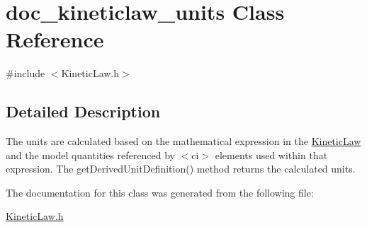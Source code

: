 \hypertarget{classdoc__kineticlaw__units}{}\section{doc\+\_\+kineticlaw\+\_\+units Class Reference}
\label{classdoc__kineticlaw__units}


{\ttfamily \#include $<$Kinetic\+Law.\+h$>$}



\subsection{Detailed Description}
\begin{DoxyParagraph}{}
The units are calculated based on the mathematical expression in the \hyperlink{class_kinetic_law}{Kinetic\+Law} and the model quantities referenced by {\ttfamily $<$ci$>$} elements used within that expression. The get\+Derived\+Unit\+Definition() method returns the calculated units. 
\end{DoxyParagraph}


The documentation for this class was generated from the following file\+:\begin{DoxyCompactItemize}
\item 
\hyperlink{_kinetic_law_8h}{Kinetic\+Law.\+h}\end{DoxyCompactItemize}
